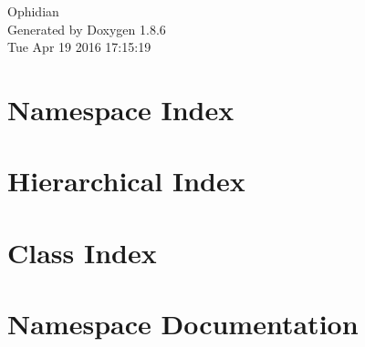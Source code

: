 \documentclass[twoside]{book}
\newcommand{\clearemptydoublepage}{%
  \newpage{\pagestyle{empty}\cleardoublepage}%
}
\begin{document}
\hypersetup{pageanchor=false}
\begin{titlepage}
\vspace*{7cm}
\begin{center}%
{\Large Ophidian }\\
\vspace*{1cm}
{\large Generated by Doxygen 1.8.6}\\
\vspace*{0.5cm}
{\small Tue Apr 19 2016 17:15:19}\\
\end{center}
\end{titlepage}
\clearemptydoublepage
\tableofcontents
\clearemptydoublepage
{}
\hypersetup{pageanchor=true}

\chapter{Namespace Index}

\chapter{Hierarchical Index}

\chapter{Class Index}

\chapter{Namespace Documentation}







\end{document}
